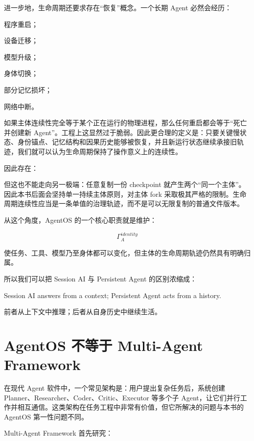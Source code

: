 进一步地，生命周期还要求存在“恢复”概念。一个长期 Agent 必然会经历：

程序重启；

设备迁移；

模型升级；

身体切换；

部分记忆损坏；

网络中断。

如果主体连续性完全等于某个正在运行的物理进程，那么任何重启都会等于“死亡并创建新 Agent”。工程上这显然过于脆弱。因此更合理的定义是：只要关键慢状态、身份锚点、记忆结构和因果历史能够被恢复，并且新运行状态继续承接旧轨迹，我们就可以认为生命周期保持了操作意义上的连续性。

因此存在：

\begin{statementbox}
\centering
{}
\end{statementbox}

但这也不能走向另一极端：任意复制一份 checkpoint 就产生两个“同一个主体”。因此本书后面会坚持单一持续主体原则，对主体 fork 采取极其严格的限制。生命周期连续性应当是一条单值的治理轨迹，而不是可以无限复制的普通文件版本。

从这个角度，AgentOS 的一个核心职责就是维护：

\[
\boxed{
\Gamma_A^{identity}
}
\]

使任务、工具、模型乃至身体都可以变化，但主体的生命周期轨迹仍然具有明确归属。

所以我们可以把 Session AI 与 Persistent Agent 的区别浓缩成：

\begin{conclusion}
Session AI answers from a context;
Persistent Agent acts from a history.
\end{conclusion}

前者从上下文中推理；后者从自身历史中继续生活。

\section{AgentOS 不等于 Multi-Agent Framework}

在现代 Agent 软件中，一个常见架构是：用户提出复杂任务后，系统创建 Planner、Researcher、Coder、Critic、Executor 等多个子 Agent，让它们并行工作并相互通信。这类架构在任务工程中非常有价值，但它所解决的问题与本书的 AgentOS 第一性问题不同。

Multi-Agent Framework 首先研究：

